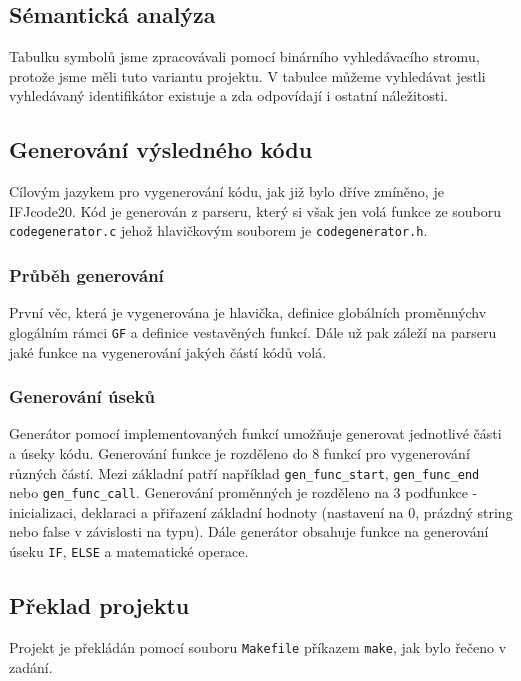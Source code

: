 \documentclass[a4paper, 11pt]{article}
\begin{document}
    \subsection{Sémantická analýza}
    Tabulku symbolů jsme zpracovávali pomocí binárního vyhledávacího stromu, protože jsme měli tuto variantu projektu. V tabulce můžeme vyhledávat jestli vyhledávaný identifikátor existuje a zda odpovídají i ostatní náležitosti.
    
    \subsection{Generování výsledného kódu}
    
    Cílovým jazykem pro vygenerování kódu, jak již bylo dříve zmíněno, je IFJcode20. Kód je generován z parseru, který si však jen volá funkce ze souboru \texttt{codegenerator.c} jehož hlavičkovým souborem je \texttt{codegenerator.h}.
    
    \subsubsection{Průběh generování}
    
    První věc, která je vygenerována je hlavička, definice globálních proměnnýchv glogálním rámci \texttt{GF} a definice vestavěných funkcí. Dále už pak záleží na parseru jaké funkce na vygenerování jakých částí kódů volá. 
    
    \newpage
    \subsubsection{Generování úseků}
    Generátor pomocí implementovaných funkcí umožňuje generovat jednotlivé části a úseky kódu. Generování funkce je rozděleno do 8 funkcí pro vygenerování různých částí. Mezi základní patří například \texttt{gen\_func\_start}, \texttt{gen\_func\_end} nebo \texttt{gen\_func\_call}. Generování proměnných je rozděleno na 3 podfunkce - inicializaci, deklaraci a přiřazení základní hodnoty (nastavení na 0, prázdný string nebo false v závislosti na typu). Dále generátor obsahuje funkce na generování úseku \texttt{IF}, \texttt{ELSE} a matematické operace.
    
    \subsection{Překlad projektu}
    
    Projekt je překládán pomocí souboru \texttt{Makefile} příkazem \texttt{make}, jak bylo řečeno v zadání.
    
\end{document}
